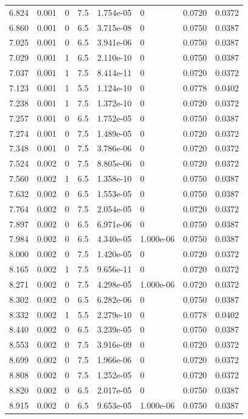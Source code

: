 \documentclass[preview]{standalone}
\begin{document}
{{{\begin{tabular}{L{1.2cm}C{1.2cm} C{0.3cm}C{0.5cm} C{1.4cm}C{1.4cm} C{1.4cm}C{1.4cm}}
  6.824  &  0.001  & 0     & 7.5 &  1.754e-05  & 0  & 0.0720 &  0.0372   \\ 
  6.860  &  0.001  & 0     & 6.5 &  3.715e-08  & 0  & 0.0750 &  0.0387   \\ 
  7.025  &  0.001  & 0     & 6.5 &  3.941e-06  & 0  & 0.0750 &  0.0387   \\ 
  7.029  &  0.001  & 1     & 6.5 &  2.110e-10  & 0  & 0.0750 &  0.0387   \\ 
  7.037  &  0.001  & 1     & 7.5 &  8.414e-11  & 0  & 0.0720 &  0.0372   \\ 
  7.123  &  0.001  & 1     & 5.5 &  1.124e-10  & 0  & 0.0778 &  0.0402   \\ 
  7.238  &  0.001  & 1     & 7.5 &  1.372e-10  & 0  & 0.0720 &  0.0372   \\ 
  7.257  &  0.001  & 0     & 6.5 &  1.752e-05  & 0  & 0.0750 &  0.0387   \\ 
  7.274  &  0.001  & 0     & 7.5 &  1.489e-05  & 0  & 0.0720 &  0.0372   \\ 
  7.348  &  0.001  & 0     & 7.5 &  3.786e-06  & 0  & 0.0720 &  0.0372   \\ 
  7.524  &  0.002  & 0     & 7.5 &  8.805e-06  & 0  & 0.0720 &  0.0372   \\ 
  7.560  &  0.002  & 1     & 6.5 &  1.358e-10  & 0  & 0.0750 &  0.0387   \\ 
  7.632  &  0.002  & 0     & 6.5 &  1.553e-05  & 0  & 0.0750 &  0.0387   \\ 
  7.764  &  0.002  & 0     & 7.5 &  2.054e-05  & 0  & 0.0720 &  0.0372   \\ 
  7.897  &  0.002  & 0     & 6.5 &  6.971e-06  & 0  & 0.0750 &  0.0387   \\ 
  7.984  &  0.002  & 0     & 6.5 &  4.340e-05  & 1.000e-06  & 0.0750 &  0.0387   \\ 
  8.000  &  0.002  & 0     & 7.5 &  1.420e-05  & 0  & 0.0720 &  0.0372   \\ 
  8.165  &  0.002  & 1     & 7.5 &  9.656e-11  & 0  & 0.0720 &  0.0372   \\ 
  8.271  &  0.002  & 0     & 7.5 &  4.298e-05  & 1.000e-06  & 0.0720 &  0.0372   \\ 
  8.302  &  0.002  & 0     & 6.5 &  6.282e-06  & 0  & 0.0750 &  0.0387   \\ 
  8.332  &  0.002  & 1     & 5.5 &  2.279e-10  & 0  & 0.0778 &  0.0402   \\ 
  8.440  &  0.002  & 0     & 6.5 &  3.239e-05  & 0  & 0.0750 &  0.0387   \\ 
  8.553  &  0.002  & 0     & 7.5 &  3.916e-09  & 0  & 0.0720 &  0.0372   \\ 
  8.699  &  0.002  & 0     & 7.5 &  1.966e-06  & 0  & 0.0720 &  0.0372   \\ 
  8.808  &  0.002  & 0     & 7.5 &  1.252e-05  & 0  & 0.0720 &  0.0372   \\ 
  8.820  &  0.002  & 0     & 6.5 &  2.017e-05  & 0  & 0.0750 &  0.0387   \\ 
  8.915  &  0.002  & 0     & 6.5 &  9.653e-05  & 1.000e-06  & 0.0750 &  0.0387   \\ 
\hline 
\end{tabular} 

}}}
\end{document}
